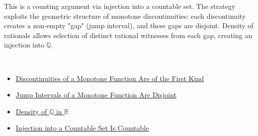 \begin{remark*}
This is a counting argument via injection into a countable set. The strategy exploits the geometric structure of monotone discontinuities: each discontinuity creates a non-empty "gap" (jump interval), and these gaps are disjoint. Density of rationals allows selection of distinct rational witnesses from each gap, creating an injection into $\mathbb{Q}$.
\end{remark*}

\begin{remark*}[Dependencies]~\\
\begin{itemize}
  \item \hyperref[prop:monotone-discontinuities-first-kind]{Discontinuities of a Monotone Function Are of the First Kind}
  \item \hyperref[cor:jump-intervals-for-monotone-discontinuities]{Jump Intervals of a Monotone Function Are Disjoint}
  \item \hyperref[thm:density-of-rationals]{Density of $\mathbb{Q}$ in $\mathbb{R}$}
  \item \hyperref[thm:countable-injection]{Injection into a Countable Set Is Countable}
\end{itemize}
\end{remark*}
